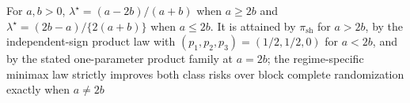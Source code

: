 For \(a,b>0\), \(\lambda^\star=(a-2b)/(a+b)\) when \(a\ge2b\) and \(\lambda^\star=(2b-a)/\{2(a+b)\}\) when \(a\le2b\). It is attained by \(\pi_{\mathrm{sh}}\) for \(a>2b\), by the independent-sign product law with \((p_1,p_2,p_3)=(1/2,1/2,0)\) for \(a<2b\), and by the stated one-parameter product family at \(a=2b\); the regime-specific minimax law strictly improves both class risks over block complete randomization exactly when \(a\ne2b\)